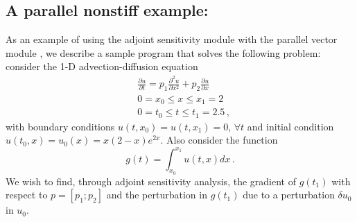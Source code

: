 \newpage
\subsection{A parallel nonstiff example: }
\label{ss:pvanx}

As an example of using the {\cvodes} adjoint sensitivity module with
the parallel vector module {\nvecp}, we describe a sample program
that solves the following problem: consider the 1-D advection-diffusion
equation
\begin{equation}\label{e:pvanx:orig_pde}
  \begin{split}
    & \frac{\partial u}{\partial t} = p_1 \frac{\partial^2 u}{\partial x^2} 
    + p_2 \frac{\partial u}{\partial x} \\
    & 0 = x_0 \le x \le x_1 = 2 \\
    & 0 = t_0 \le t \le t_1 = 2.5 \, ,
  \end{split}
\end{equation}
with boundary conditions $u(t,x_0) = u(t,x_1) = 0 ,\, \forall t$
and initial condition $u(t_0 , x) = u_0(x) = x(2-x)e^{2x}$. Also
consider the function
\begin{equation*}
  g(t) = \int_{x_0}^{x_1} u(t,x) dx \, .
\end{equation*}
We wish to find, through adjoint sensitivity analysis, the gradient of
$g(t_1)$ with respect to $p = [p_1 ; p_2]$ and the perturbation in $g(t_1)$
due to a perturbation $\delta u_0$ in $u_0$.

